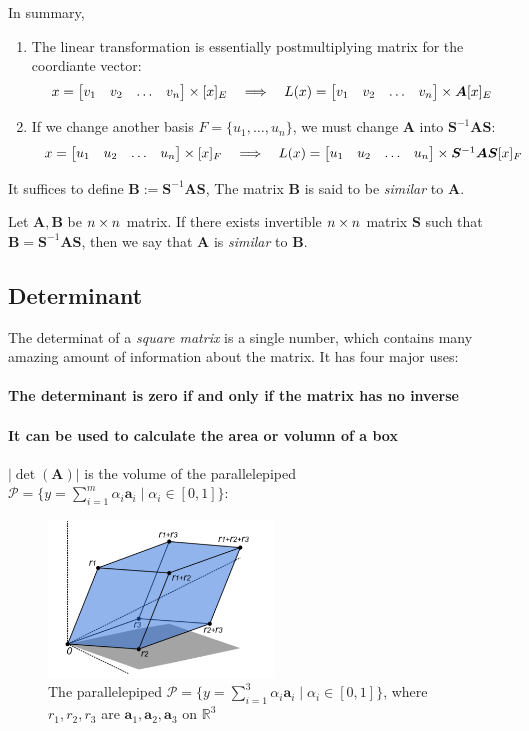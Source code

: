 In summary, 
\begin{enumerate}
\item
The linear transformation is essentially postmultiplying matrix for the coordiante vector:
\[
\begin{array}{lll}
x =\begin{bmatrix}v_1&v_2&\dots&v_n\end{bmatrix}\times [x]_{E}
&
\implies
&
L(x)=\begin{bmatrix}v_1&v_2&\dots&v_n\end{bmatrix}\times \bm A[x]_{E}
\end{array}
\]
\item
If we change another basis $F=\{u_1,\dots,u_n\}$, we must change $\bm A$ into $\bm S^{-1}\bm A\bm S$:
\[
\begin{array}{lll}
x =\begin{bmatrix}u_1&u_2&\dots&u_n\end{bmatrix}\times [x]_{F}
&
\implies
&
L(x)=\begin{bmatrix}u_1&u_2&\dots&u_n\end{bmatrix}\times \bm S^{-1}\bm A\bm S[x]_{F}
\end{array}
\]
\end{enumerate}
It suffices to define $\bm B:=\bm S^{-1}\bm A\bm S$, The matrix $\bm B$ is said to be \emph{similar} to $\bm A$.
\begin{definition}[Similar]
Let $\bm A,\bm B$ be $n\times n$ matrix. If there exists invertible $n\times n$ matrix $\bm S$ such that $\bm B=\bm S^{-1}\bm A\bm S$, then we say that $\bm A$ is \emph{similar} to $\bm B$.
\end{definition}
\subsection{Determinant}
The determinat of a \emph{square matrix} is a single number, which contains many amazing amount of information about the matrix. It has four major uses:
\paragraph{The determinant is zero if and only if the matrix has no inverse}
\paragraph{It can be used to calculate the area or volumn of a box} $|\det(\bm A)|$ is the volume of the parallelepiped $\mathcal{P}=\{y=\sum_{i=1}^m\alpha_i\bm a_i\mid \alpha_i\in[0,1]\}$:
\begin{figure}[H]
\centering
\includegraphics[width=6cm]{week4/F_1.png}
\caption{The parallelepiped $\mathcal{P}=\{y=\sum_{i=1}^3\alpha_i\bm a_i\mid \alpha_i\in[0,1]\}$, where $r_1,r_2,r_3$ are $\bm a_1,\bm a_2,\bm a_3$ on $\mathbb{R}^3$}
\end{figure}
